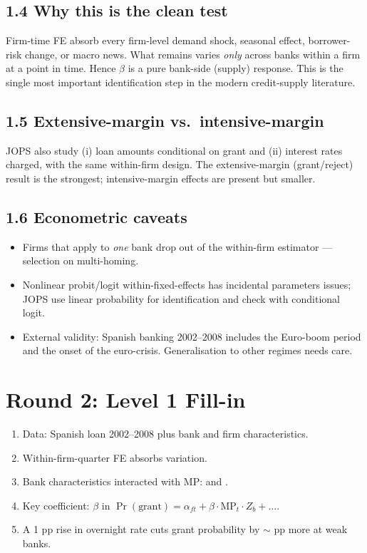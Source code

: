 \documentclass[11pt]{article}
\newcommand{\blank}[1]{\underline{\hspace{#1}}}
\begin{document}
\subsection*{1.4 Why this is the clean test}
\begin{keybox}
Firm-time FE absorb every firm-level demand shock, seasonal effect, borrower-risk change, or macro news. What remains varies \emph{only} across banks within a firm at a point in time. Hence $\beta$ is a pure bank-side (supply) response. This is the single most important identification step in the modern credit-supply literature.
\end{keybox}

\subsection*{1.5 Extensive-margin vs.\ intensive-margin}
JOPS also study (i) loan amounts conditional on grant and (ii) interest rates charged, with the same within-firm design. The extensive-margin (grant/reject) result is the strongest; intensive-margin effects are present but smaller.

\subsection*{1.6 Econometric caveats}
\begin{alertbox}
\begin{itemize}
\item Firms that apply to \emph{one} bank drop out of the within-firm estimator --- selection on multi-homing.
\item Nonlinear probit/logit within-fixed-effects has incidental parameters issues; JOPS use linear probability for identification and check with conditional logit.
\item External validity: Spanish banking 2002--2008 includes the Euro-boom period and the onset of the euro-crisis. Generalisation to other regimes needs care.
\end{itemize}
\end{alertbox}

\section*{Round 2: Level 1 Fill-in}
\begin{enumerate}
\item Data: Spanish loan \blank{2cm} 2002--2008 plus bank and firm characteristics.
\item Within-firm-quarter FE absorbs \blank{2cm} variation.
\item Bank characteristics interacted with MP: \blank{2cm} and \blank{2cm}.
\item Key coefficient: $\beta$ in $\Pr(\text{grant})=\alpha_{ft}+\beta\cdot\mathrm{MP}_t\cdot Z_b+\dots$.
\item A 1 pp rise in overnight rate cuts grant probability by $\sim$\blank{1cm} pp more at weak banks.
\end{enumerate}
\end{document}
